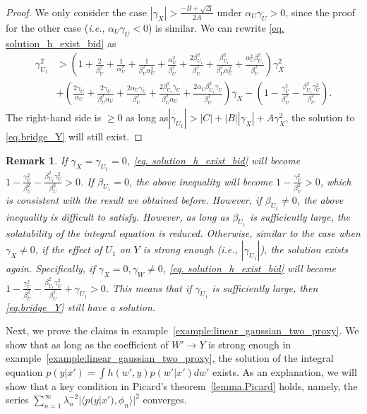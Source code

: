 \documentclass[
  12pt]{article}
\newtheorem{remark}{Remark}
\def\to{\rightarrow}
\begin{document}
\begin{proof}
We only consider the case $|\gamma_X|>\frac{-B+\sqrt{\Delta}}{2A}$ under $\alpha_U\gamma_U>0$, since the proof for the other case (\emph{i.e.}, $\alpha_U \gamma_U<0$) is similar. We can rewrite \eqref{eq. solution_h_exist_bid} as
$$
\begin{aligned}
	\gamma_{U_1}^2&>\left( 1+\frac{2}{\beta_{U}^{2}}+\frac{1}{\alpha_{U}^{2}}+\frac{1}{\beta_{U}^{2}\alpha_{U}^{2}}+\frac{\alpha_{U}^{2}}{\beta_{U}^{2}}+\frac{2\beta_{U_1}^{2}}{\beta_{U}^{2}}+\frac{\beta_{U_1}^{2}}{\beta_{U}^{2}\alpha_{U}^{2}}+\frac{\alpha_{U}^{2}\beta_{U_1}^{2}}{\beta_{U}^{2}} \right) \gamma_{X}^{2}\\
	&+\left( \frac{2\gamma_U}{\alpha_U}+\frac{2\gamma_U}{\beta_{U}^{2}\alpha_U}+\frac{2\alpha_U\gamma_U}{\beta_{U}^{2}}+\frac{2\beta_{U_1}^{2}\gamma_U}{\beta_{U}^{2}\alpha_U}+\frac{2\alpha_U\beta_{U_1}^{2}\gamma_U}{\beta_{U}^{2}} \right) \gamma_X-\left( 1-\frac{\gamma_{U}^{2}}{\beta_{U}^{2}}-\frac{\beta_{U_1}^{2}\gamma_{U}^{2}}{\beta_{U}^{2}} \right).
\end{aligned}
$$
The right-hand side is $\geq 0$ as long as$|\gamma_{U_1}| > |C| + |B||\gamma_X| + A\gamma_X^2$, the solution to \eqref{eq.bridge_Y} will still exist.
\end{proof}
\begin{remark}
If $\gamma_X=\gamma_{U_1}=0$,  \eqref{eq. solution_h_exist_bid} will become $1-\frac{\gamma_{U}^{2}}{\beta_{U}^{2}}-\frac{\beta_{U_1}^{2}\gamma_{U}^{2}}{\beta_{U}^{2}}>0$. If $\beta_{U_1}=0$, the above inequality will become $1-\frac{\gamma_{U}^{2}}{\beta_{U}^{2}}>0$, which is consistent with the result we obtained before. However, if $\beta_{U_1}\ne0$, the above inequality is difficult to satisfy. However, as long as $\beta_{U_1}$ is sufficiently large, the solatability of the integral equation is reduced. Otherwise, similar to the case when $\gamma_X \neq 0$, if the effect of $U_1$ on $Y$ is strong enough (\emph{i.e.}, $|\gamma_{U_1}|$), the solution exists again. Specifically, if $\gamma_X=0,\gamma_W\ne0$,  \eqref{eq. solution_h_exist_bid} will become $1-\frac{\gamma_{U}^{2}}{\beta_{U}^{2}}-\frac{\beta_{U_1}^{2}\gamma_{U}^{2}}{\beta_{U}^{2}}+\gamma_{U_1}>0$. This means that if $\gamma_{U_1}$ is sufficiently large, then \eqref{eq.bridge_Y} still have a solution. 
\end{remark}



Next, we prove the claims in example~\ref{example:linear_gaussian_two_proxy}. We show that as long as the coefficient of $W' \to Y$ is strong enough in example~\ref{example:linear_gaussian_two_proxy}, the solution of the integral equation $p(y|x')=\int h(w',y)p(w'|x')dw'$ exists. As an explanation, we will show that a key condition in Picard's theorem~\ref{lemma.Picard} holds, namely, the series $\sum_{n=1}^\infty \lambda_n^{-2} |\langle p(y|x'),\phi_n \rangle|^2$ converges. 
\end{document}
